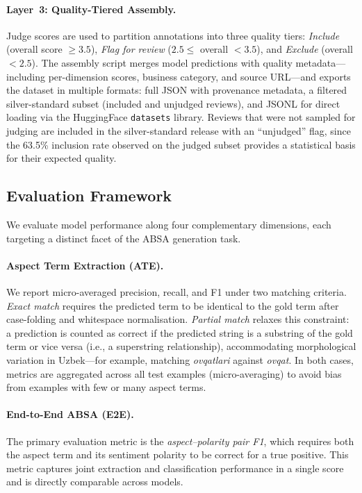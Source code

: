 \documentclass[runningheads]{llncs}
\begin{document}
\paragraph{Layer~3: Quality-Tiered Assembly.} Judge scores are used to partition annotations into three quality tiers: \emph{Include} (overall score $\geq 3.5$), \emph{Flag for review} ($2.5 \leq$ overall $< 3.5$), and \emph{Exclude} (overall $< 2.5$). The assembly script merges model predictions with quality metadata---including per-dimension scores, business category, and source URL---and exports the dataset in multiple formats: full JSON with provenance metadata, a filtered silver-standard subset (included and unjudged reviews), and JSONL for direct loading via the HuggingFace \texttt{datasets} library. Reviews that were not sampled for judging are included in the silver-standard release with an ``unjudged'' flag, since the 63.5\% inclusion rate observed on the judged subset provides a statistical basis for their expected quality.

\subsection{Evaluation Framework}
\label{sec:meth_eval}

We evaluate model performance along four complementary dimensions, each targeting a distinct facet of the ABSA generation task.

\paragraph{Aspect Term Extraction (ATE).} We report micro-averaged precision, recall, and F1 under two matching criteria. \emph{Exact match} requires the predicted term to be identical to the gold term after case-folding and whitespace normalisation. \emph{Partial match} relaxes this constraint: a prediction is counted as correct if the predicted string is a substring of the gold term or vice versa (i.e., a superstring relationship), accommodating morphological variation in Uzbek---for example, matching \textit{ovqatlari} against \textit{ovqat}. In both cases, metrics are aggregated across all test examples (micro-averaging) to avoid bias from examples with few or many aspect terms.

\paragraph{End-to-End ABSA (E2E).} The primary evaluation metric is the \emph{aspect--polarity pair F1}, which requires both the aspect term and its sentiment polarity to be correct for a true positive. This metric captures joint extraction and classification performance in a single score and is directly comparable across models.
\end{document}
